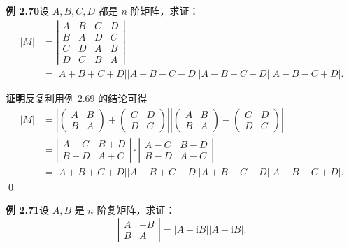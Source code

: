 \documentclass[UTF8, 12pt, fontset=fandol, oneside]{ctexart}
\begin{document}
\noindent\textbf{例 2.70}\quad 设 $A,B,C,D$ 都是 $n$ 阶矩阵，求证：
\[
\begin{aligned}
|M|
&=
\left|
\begin{array}{cccc}
A & B & C & D\\
B & A & D & C\\
C & D & A & B\\
D & C & B & A
\end{array}
\right|\\
&=|A+B+C+D||A+B-C-D||A-B+C-D||A-B-C+D|.
\end{aligned}
\]

\noindent\textbf{证明}\quad 反复利用例 2.69 的结论可得
\[
\begin{aligned}
|M|
&=
\left|
\left(
\begin{array}{cc}
A & B\\
B & A
\end{array}
\right)
+
\left(
\begin{array}{cc}
C & D\\
D & C
\end{array}
\right)
\right|
\left|
\left(
\begin{array}{cc}
A & B\\
B & A
\end{array}
\right)
-
\left(
\begin{array}{cc}
C & D\\
D & C
\end{array}
\right)
\right|\\
&=
\left|
\begin{array}{cc}
A+C & B+D\\
B+D & A+C
\end{array}
\right|
\cdot
\left|
\begin{array}{cc}
A-C & B-D\\
B-D & A-C
\end{array}
\right|\\
&=|A+B+C+D||A-B+C-D||A+B-C-D||A-B-C+D|.
\end{aligned}
\]
\qed

\noindent\textbf{例 2.71}\quad 设 $A,B$ 是 $n$ 阶复矩阵，求证：
\[
\left|
\begin{array}{cc}
A & -B\\
B & A
\end{array}
\right|
=|A+\mathrm iB||A-\mathrm iB|.
\]
\end{document}
